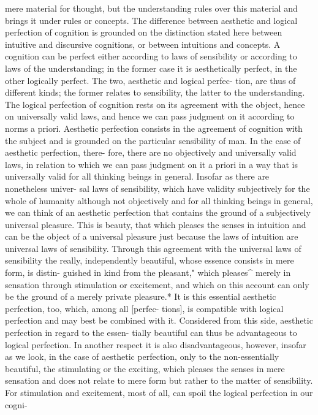 mere material for thought, but the understanding rules over this material
and brings it under rules or concepts.
The difference between aesthetic and logical perfection of cognition is
grounded on the distinction stated here between intuitive and discursive
cognitions, or between intuitions and concepts.
A cognition can be perfect either according to laws of sensibility or
according to laws of the understanding; in the former case it is aesthetically
perfect, in the other logically perfect. The two, aesthetic and logical perfec-
tion, are thus of different kinds; the former relates to sensibility, the latter
to the understanding. The logical perfection of cognition rests on its
agreement with the object, hence on universally valid laws, and hence we
can pass judgment on it according to norms a priori. Aesthetic perfection
consists in the agreement of cognition with the subject and is grounded on
the particular sensibility of man. In the case of aesthetic perfection, there-
fore, there are no objectively and universally valid laws, in relation to
which we can pass judgment on it a priori in a way that is universally valid
for all thinking beings in general. Insofar as there are nonetheless univer-
sal laws of sensibility, which have validity subjectively for the whole of
humanity although not objectively and for all thinking beings in general,
we can think of an aesthetic perfection that contains the ground of a
subjectively universal pleasure. This is beauty, that which pleases the
senses in intuition and can be the object of a universal pleasure just
because the laws of intuition are universal laws of sensibility.
Through this agreement with the universal laws of sensibility the really,
independently beautiful, whose essence consists in mere form, is distin-
guished in kind from the pleasant," which pleases^ merely in sensation
through stimulation or excitement, and which on this account can only be
the ground of a merely private pleasure.*
It is this essential aesthetic perfection, too, which, among all [perfec-
tions], is compatible with logical perfection and may best be combined
with it.
Considered from this side, aesthetic perfection in regard to the essen-
tially beautiful can thus be advantageous to logical perfection. In another
respect it is also disadvantageous, however, insofar as we look, in the case
of aesthetic perfection, only to the non-essentially beautiful, the stimulating
or the exciting, which pleases the senses in mere sensation and does not
relate to mere form but rather to the matter of sensibility. For stimulation
and excitement, most of all, can spoil the logical perfection in our cogni-
